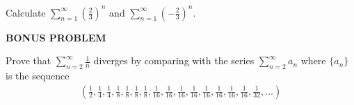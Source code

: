 \documentclass{ximera}
\begin{document}
\begin{exercise}
    Calculate $\sum\limits_{n=1}^\infty \left(\frac23\right)^n$ and $\sum\limits_{n=1}^\infty \left(-\frac23\right)^n$.
\end{exercise}

\textbf{BONUS PROBLEM}
\begin{exercise}
    Prove that $\sum\limits_{n=2}^\infty \frac1n$ diverges by comparing with the series $\sum\limits_{n=2}^\infty a_n$ where $\{a_n\}$ is the sequence
    \begin{align*}
        \left(\frac12, \frac14, \frac14, \frac18, \frac18, \frac18, \frac18, \frac1{16}, \frac1{16}, \frac1{16}, \frac1{16}, \frac1{16}, \frac1{16}, \frac1{16}, \frac1{16}, \frac1{32}, ...\right)
    \end{align*}
\end{exercise}
\end{document}
